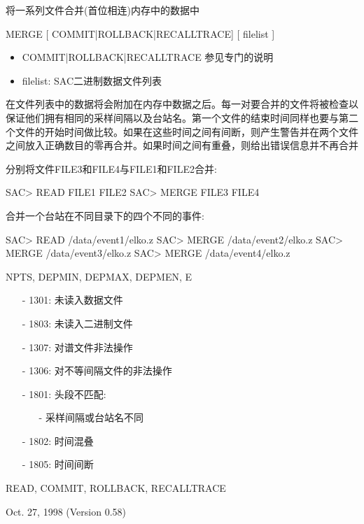 \label{cmd:merge}

将一系列文件合并(首位相连)内存中的数据中

MERGE [ COMMIT|ROLLBACK|RECALLTRACE] [ filelist ]

\begin{itemize}
\item COMMIT|ROLLBACK|RECALLTRACE 参见专门的说明
\item filelist: SAC二进制数据文件列表
\end{itemize}

在文件列表中的数据将会附加在内存中数据之后。每一对要合并的文件将被检查以保证他们拥有相同的采样间隔以及台站名。第一个文件的结束时间同样也要与第二个文件的开始时间做比较。如果在这些时间之间有间断，则产生警告并在两个文件之间放入正确数目的零再合并。如果时间之间有重叠，则给出错误信息并不再合并

分别将文件FILE3和FILE4与FILE1和FILE2合并:
\begin{SACCode}
SAC> READ FILE1 FILE2
SAC> MERGE FILE3 FILE4
\end{SACCode}
合并一个台站在不同目录下的四个不同的事件:
\begin{SACCode}
SAC> READ /data/event1/elko.z
SAC> MERGE /data/event2/elko.z
SAC> MERGE /data/event3/elko.z
SAC> MERGE /data/event4/elko.z
\end{SACCode}

NPTS, DEPMIN, DEPMAX, DEPMEN, E

\begin{itemize}
\item[-]1301: 未读入数据文件
\item[-]1803: 未读入二进制文件
\item[-]1307: 对谱文件非法操作
\item[-]1306: 对不等间隔文件的非法操作
\item[-]1801: 头段不匹配:
	\begin{itemize}
	\item[-]采样间隔或台站名不同
	\end{itemize}
\item[-]1802: 时间混叠
\end{itemize}

\begin{itemize}
\item[-]1805: 时间间断
\end{itemize}

READ, COMMIT, ROLLBACK, RECALLTRACE

Oct. 27, 1998 (Version 0.58)
